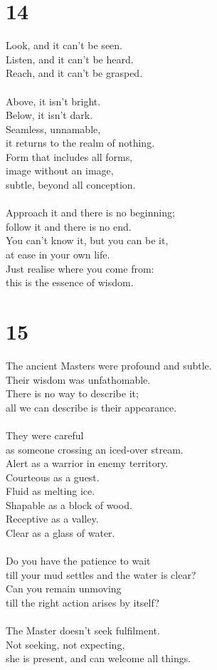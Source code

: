 \documentclass[b5paper, 12pt, oneside]{book}
\begin{document}
\chapter*{14}
Look, and it can't be seen.\\
Listen, and it can't be heard.\\
Reach, and it can't be grasped.\\
\\
Above, it isn't bright.\\
Below, it isn't dark.\\
Seamless, unnamable,\\
it returns to the realm of nothing.\\
Form that includes all forms,\\
image without an image,\\
subtle, beyond all conception.\\
\\
Approach it and there is no beginning;\\
follow it and there is no end.\\
You can't know it, but you can be it,\\
at ease in your own life.\\
Just realise where you come from:\\
this is the essence of wisdom.\\

\chapter*{15}
The ancient Masters were profound and subtle.\\
Their wisdom was unfathomable.\\
There is no way to describe it;\\
all we can describe is their appearance.\\
\\
They were careful\\
as someone crossing an iced-over stream.\\
Alert as a warrior in enemy territory.\\
Courteous as a guest.\\
Fluid as melting ice.\\
Shapable as a block of wood.\\
Receptive as a valley.\\
Clear as a glass of water.\\
\\
Do you have the patience to wait\\
till your mud settles and the water is clear?\\
Can you remain unmoving\\
till the right action arises by itself?\\
\\
The Master doesn't seek fulfilment.\\
Not seeking, not expecting,\\
she is present, and can welcome all things.\\
\end{document}
